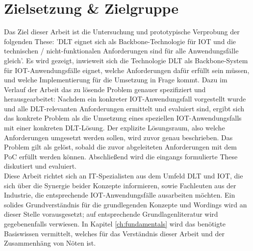 \section{Zielsetzung \& Zielgruppe}
\label{sec:intro:goal}
Das Ziel dieser Arbeit ist die Untersuchung und prototypische Verprobung der folgenden These: '\ac{DLT} eignet sich als Backbone-Technologie für \ac{IOT} und die technischen / nicht-funktionalen Anforderungen sind für alle Anwendungsfälle gleich'. Es wird gezeigt, inwieweit sich die Technologie \ac{DLT} als Backbone-System für \ac{IOT}-Anwendungsfälle eignet, welche Anforderungen dafür erfüllt sein müssen, und welche Implementierung für die Umsetzung in Frage kommt. Dazu im Verlauf der Arbeit das zu lösende Problem genauer spezifiziert und herausgearbeitet: Nachdem ein konkreter \ac{IOT}-Anwendungsfall vorgestellt wurde und alle \ac{DLT}-relevanten Anforderungen ermittelt und evaluiert sind, ergibt sich das konkrete Problem als die Umsetzung eines speziellen \ac{IOT}-Anwendungsfalls mit einer konkreten \ac{DLT}-Lösung. Der explizite Lösungsraum, also welche Anforderungen umgesetzt werden sollen, wird zuvor genau beschrieben. Das Problem gilt als gelöst, sobald die zuvor abgeleiteten Anforderungen mit dem \ac{PoC} erfüllt werden können. Abschließend wird die eingangs formulierte These diskutiert und evaluiert.\\
Diese Arbeit richtet sich an IT-Spezialisten aus dem Umfeld \ac{DLT} und \ac{IOT}, die sich über die Synergie beider Konzepte informieren, sowie Fachleuten aus der Industrie, die entsprechende \ac{IOT}-Anwendungsfälle ausarbeiten möchten. Ein solides Grundverständnis für die grundlegenden Konzepte und Wordings wird an dieser Stelle vorausgesetzt; auf entsprechende Grundlagenliteratur wird gegebenenfalls verwiesen. In Kapitel \ref{ch:fundamentals} wird das benötigte Basiswissen vermittelt, welches für das Verständnis dieser Arbeit und der Zusammenhäng von Nöten ist.

%
%

